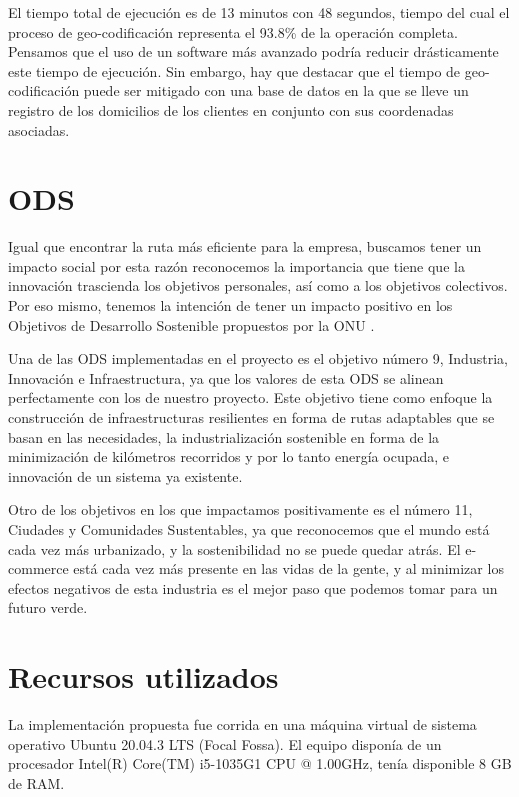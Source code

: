 \documentclass[journal]{IEEEtran}
\begin{document}
            El tiempo total de ejecución es de 13 minutos con 48 segundos, tiempo del cual el proceso de geo-codificación representa el 93.8\% de la operación completa. Pensamos que el uso de un software más avanzado podría reducir drásticamente este tiempo de ejecución. Sin embargo, hay que destacar que el tiempo de geo-codificación puede ser mitigado con una base de datos en la que se lleve un registro de los domicilios de los clientes en conjunto con sus coordenadas asociadas.
        
    \section{ODS} \label{sec:ods}
    
        Igual que encontrar la ruta más eficiente para la empresa, buscamos tener un impacto social por esta razón reconocemos la importancia que tiene que la innovación trascienda los objetivos personales, así como a los objetivos colectivos. Por eso mismo, tenemos la intención de tener un impacto positivo en los Objetivos de Desarrollo Sostenible propuestos por la ONU \cite{united-nations-2015}. 
        
        Una de las ODS implementadas en el proyecto es el objetivo número 9,  Industria, Innovación e Infraestructura, ya que los valores de esta ODS se alinean perfectamente con los de nuestro proyecto. Este objetivo tiene como enfoque la construcción de infraestructuras resilientes en forma de rutas adaptables que se basan en las necesidades, la industrialización sostenible en forma de la minimización de kilómetros recorridos y por lo tanto energía ocupada, e innovación de un sistema ya existente. 
        
        Otro de los objetivos en los que impactamos positivamente es el número 11, Ciudades y Comunidades Sustentables, ya que reconocemos que el mundo está cada vez más urbanizado, y la sostenibilidad no se puede quedar atrás. El e-commerce está cada vez más presente en las vidas de la gente, y al minimizar los efectos negativos de esta industria es el mejor paso que podemos tomar para un futuro verde. 

    \section{Recursos utilizados} \label{sec:resources}
        
        La implementación propuesta fue corrida en una máquina virtual de sistema operativo Ubuntu 20.04.3 LTS (Focal Fossa). El equipo disponía de un procesador Intel(R) Core(TM) i5-1035G1 CPU @ 1.00GHz, tenía disponible 8 GB de RAM.
\end{document}
